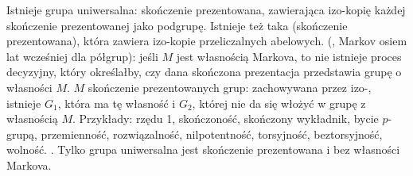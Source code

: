 Istnieje  grupa uniwersalna: skończenie prezentowana, zawierająca izo-kopię każdej skończenie prezentowanej jako podgrupę.
Istnieje też taka (skończenie prezentowana), która zawiera izo-kopie przeliczalnych abelowych.
 (, Markov osiem lat wcześniej dla półgrup): jeśli $M$ jest własnością Markova, to nie istnieje proces decyzyjny, który określałby, czy dana skończona prezentacja przedstawia grupę o własności $M$.
 $M$ skończenie prezentowanych grup: zachowywana przez izo-, istnieje $G_1$, która ma tę własność i $G_2$, której nie da się włożyć w grupę z własnością $M$.
Przykłady: rzędu 1, skończoność, skończony wykładnik, bycie $p$-grupą, przemienność, rozwiązalność, nilpotentność, torsyjność, beztorsyjność, wolność.
.
Tylko grupa uniwersalna jest skończenie prezentowana i bez własności Markova.